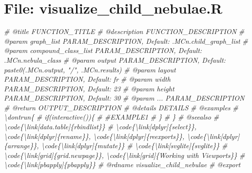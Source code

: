 \documentclass[
]{article}
\newenvironment{Shaded}{\begin{snugshade}}{\end{snugshade}}
\newcommand{\CommentTok}[1]{\textcolor[rgb]{0.56,0.35,0.01}{\textit{#1}}}
\begin{document}
\hypertarget{file-visualize_child_nebulae.r}{%
\section{File: visualize\_child\_nebulae.R}\label{file-visualize_child_nebulae.r}}

\begin{Shaded}
\begin{Highlighting}[]
\CommentTok{\#\textquotesingle{} @title FUNCTION\_TITLE}
\CommentTok{\#\textquotesingle{} @description FUNCTION\_DESCRIPTION}
\CommentTok{\#\textquotesingle{} @param graph\_list PARAM\_DESCRIPTION, Default: .MCn.child\_graph\_list}
\CommentTok{\#\textquotesingle{} @param compound\_class\_list PARAM\_DESCRIPTION, Default: .MCn.nebula\_class}
\CommentTok{\#\textquotesingle{} @param output PARAM\_DESCRIPTION, Default: paste0(.MCn.output, "/", .MCn.results)}
\CommentTok{\#\textquotesingle{} @param layout PARAM\_DESCRIPTION, Default: \textquotesingle{}fr\textquotesingle{}}
\CommentTok{\#\textquotesingle{} @param width PARAM\_DESCRIPTION, Default: 23}
\CommentTok{\#\textquotesingle{} @param height PARAM\_DESCRIPTION, Default: 30}
\CommentTok{\#\textquotesingle{} @param ... PARAM\_DESCRIPTION}
\CommentTok{\#\textquotesingle{} @return OUTPUT\_DESCRIPTION}
\CommentTok{\#\textquotesingle{} @details DETAILS}
\CommentTok{\#\textquotesingle{} @examples }
\CommentTok{\#\textquotesingle{} \textbackslash{}dontrun\{}
\CommentTok{\#\textquotesingle{} if(interactive())\{}
\CommentTok{\#\textquotesingle{}  \#EXAMPLE1}
\CommentTok{\#\textquotesingle{}  \}}
\CommentTok{\#\textquotesingle{} \}}
\CommentTok{\#\textquotesingle{} @seealso }
\CommentTok{\#\textquotesingle{}  \textbackslash{}code\{\textbackslash{}link[data.table]\{rbindlist\}\}}
\CommentTok{\#\textquotesingle{}  \textbackslash{}code\{\textbackslash{}link[dplyr]\{select\}\}, \textbackslash{}code\{\textbackslash{}link[dplyr]\{rename\}\}, \textbackslash{}code\{\textbackslash{}link[dplyr]\{reexports\}\}, \textbackslash{}code\{\textbackslash{}link[dplyr]\{arrange\}\}, \textbackslash{}code\{\textbackslash{}link[dplyr]\{mutate\}\}}
\CommentTok{\#\textquotesingle{}  \textbackslash{}code\{\textbackslash{}link[svglite]\{svglite\}\}}
\CommentTok{\#\textquotesingle{}  \textbackslash{}code\{\textbackslash{}link[grid]\{grid.newpage\}\}, \textbackslash{}code\{\textbackslash{}link[grid]\{Working with Viewports\}\}}
\CommentTok{\#\textquotesingle{}  \textbackslash{}code\{\textbackslash{}link[pbapply]\{pbapply\}\}}
\CommentTok{\#\textquotesingle{} @rdname visualize\_child\_nebulae}
\CommentTok{\#\textquotesingle{} @export }

\end{Highlighting}
\end{Shaded}
\end{document}
